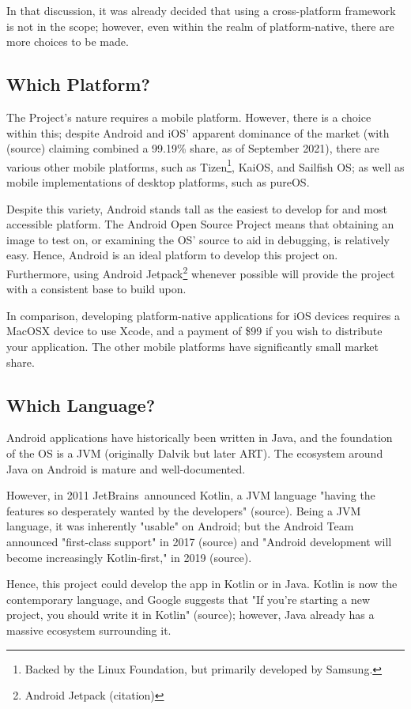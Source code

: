 \documentclass[11pt, a4paper, notitlepage]{report}
\begin{document}
In that discussion, it was already decided that using a cross-platform 
framework is not in the scope; however, even within the realm of 
platform-native, there are more choices to be made.

\subsection{Which Platform?}
The Project's nature requires a mobile platform. However, there is a choice 
within this; despite Android and iOS' apparent dominance of the market (with 
(source) claiming combined a 99.19\% share, as of September 2021), there 
are various other mobile platforms, such as Tizen\footnote{Backed by the Linux 
Foundation, but primarily developed by Samsung.}, KaiOS, and Sailfish OS; as 
well as mobile implementations of desktop platforms, such as pureOS.

Despite this variety, Android stands tall as the easiest to develop for and 
most accessible platform. The Android Open Source Project means that obtaining 
an image to test on, or examining the OS' source to aid in debugging, is 
relatively easy. Hence, Android is an ideal platform to develop this project 
on. Furthermore, using Android Jetpack\footnote{Android Jetpack (citation)} 
whenever possible will provide the project with a consistent base to build upon.

In comparison, developing platform-native applications for iOS devices requires 
a MacOSX device to use Xcode, and a payment of \$99 if you wish to distribute 
your application. The other mobile platforms have significantly small market 
share.

\subsection{Which Language?}
Android applications have historically been written in Java, and the foundation 
of the OS is a JVM (originally Dalvik but later ART). The ecosystem around Java 
on Android is mature and well-documented.

However, in 2011 JetBrains\texttrademark\ announced Kotlin, a JVM language 
"having the features so desperately wanted by the developers" (source). Being a 
JVM language, it was inherently "usable" on Android; but the Android Team 
announced "first-class support" in 2017 (source) and "Android development will 
become increasingly Kotlin-first," in 2019 (source).

Hence, this project could develop the app in Kotlin or in Java. Kotlin is now 
the contemporary language, and Google suggests that "If you’re starting a new 
project, you should write it in Kotlin" (source); however, Java already has a 
massive ecosystem surrounding it.
\end{document}

